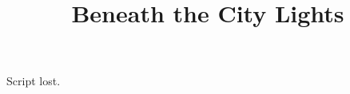 \documentclass[11pt]{article}
\begin{document}
\title{Beneath the City Lights}
\maketitle
Script lost. 
\end{document}
